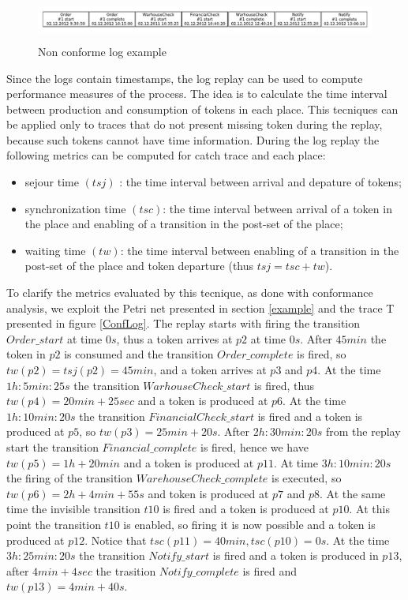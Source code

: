 \documentclass[11pt]{article}
\begin{document}
\begin{figure}[t]\label{NonConfLog}
\centering
\includegraphics[width=400pt,height=40pt]
{./items/logNonConforme.pdf}
\caption{Non conforme log example}
\end{figure}

Since the logs contain timestamps, the log replay can be used to compute performance measures of the process. The idea is to calculate the time interval between production and consumption of tokens in each place. This tecniques can be applied only to traces that do not present missing token during the replay, because such tokens cannot have time information. During the log replay the following metrics can be computed for catch trace and each place:
\begin{itemize}
\item sejour time $(tsj)$ : the time interval between arrival and depature of tokens;
\item synchronization time $(tsc)$: the time interval between arrival of a token in the place and enabling of a transition in the post-set of the place;
\item waiting time $(tw)$:  the time interval between enabling of a transition in the post-set of the place and token departure (thus $tsj=tsc+tw $).
\end{itemize}

To clarify the metrics evaluated by this tecnique, as done with conformance analysis, we exploit the Petri net  presented in section \ref{example} and the trace T presented in figure \ref{ConfLog}. The replay starts with firing the transition $Order\_start$ at time $0s$, thus a token arrives at $p2$ at time $0s$. After $45 min$ the token in $p2$ is consumed and the transition $Order\_complete$ is fired, so $tw(p2)=tsj(p2)=45min$, and a token arrives at $p3$ and $p4$. At the time $1h:5min:25s$ the transition $WarhouseCheck\_start$ is fired, thus $tw(p4)=20min+25sec$ and a token is produced at $p6$. At the time $1h:10min:20s$ the transition $FinancialCheck\_start$ is fired and a token is produced at $p5$, so $tw(p3)=25min+20s$. After $2h:30min:20s$ from the replay start the transition $Financial\_complete$ is fired, hence we have $tw(p5)=1h+20min$ and a token is produced at $p11$. At time $3h:10min:20s$ the firing of the transition $WarehouseCheck\_complete$ is executed, so $tw(p6)=2h+4min+55s$ and token is produced at $p7$ and $p8$. At the same time the invisible transition $t10$ is fired and a token is produced at $p10$. At this point the transition $t10$ is enabled, so firing it is now possible and a token is produced at $p12$. Notice that $tsc(p11)=40min, tsc(p10)=0s$. At the time $3h:25min:20s$ the transition $Notify\_start$ is fired and a token is produced in $p13$, after $4min+4sec$ the trasition $Notify\_complete$ is fired and $tw(p13) = 4min+40s$.
\end{document}
